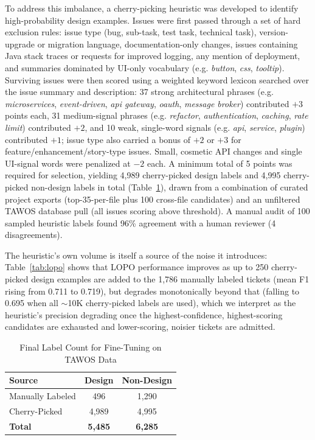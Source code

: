 \documentclass[preprint,12pt]{elsarticle}
\begin{document}
To address this imbalance, a cherry-picking heuristic was developed to identify high-probability design examples. Issues were first passed through a set of hard exclusion rules: issue type (bug, sub-task, test task, technical task), version-upgrade or migration language, documentation-only changes, issues containing Java stack traces or requests for improved logging, any mention of deployment, and summaries dominated by UI-only vocabulary (e.g. \emph{button}, \emph{css}, \emph{tooltip}). Surviving issues were then scored using a weighted keyword lexicon searched over the issue summary and description: 37 strong architectural phrases (e.g. \emph{microservices}, \emph{event-driven}, \emph{api gateway}, \emph{oauth}, \emph{message broker}) contributed $+3$ points each, 31 medium-signal phrases (e.g. \emph{refactor}, \emph{authentication}, \emph{caching}, \emph{rate limit}) contributed $+2$, and 10 weak, single-word signals (e.g. \emph{api}, \emph{service}, \emph{plugin}) contributed $+1$; issue type also carried a bonus of $+2$ or $+3$ for feature/enhancement/story-type issues. Small, cosmetic API changes and single UI-signal words were penalized at $-2$ each. A minimum total of 5 points was required for selection, yielding 4,989 cherry-picked design labels and 4,995 cherry-picked non-design labels in total (Table~\ref{tab:labels}), drawn from a combination of curated project exports (top-35-per-file plus 100 cross-file candidates) and an unfiltered TAWOS database pull (all issues scoring above threshold). A manual audit of 100 sampled heuristic labels found 96\% agreement with a human reviewer (4 disagreements).

The heuristic's own volume is itself a source of the noise it introduces: Table~\ref{tab:lopo} shows that LOPO performance improves as up to 250 cherry-picked design examples are added to the 1,786 manually labeled tickets (mean F1 rising from 0.711 to 0.719), but degrades monotonically beyond that (falling to 0.695 when all $\sim$10K cherry-picked labels are used), which we interpret as the heuristic's precision degrading once the highest-confidence, highest-scoring candidates are exhausted and lower-scoring, noisier tickets are admitted.

\begin{table}[t]
\centering
\begin{tabular}{lcc}
\toprule
\textbf{Source} & \textbf{Design} & \textbf{Non-Design} \\
\midrule
Manually Labeled & 496 & 1,290 \\
Cherry-Picked & 4,989 & 4,995 \\
\midrule
\textbf{Total} & \textbf{5,485} & \textbf{6,285} \\
\bottomrule
\end{tabular}
\caption{Final Label Count for Fine-Tuning on TAWOS Data}
\label{tab:labels}
\end{table}
\end{document}
